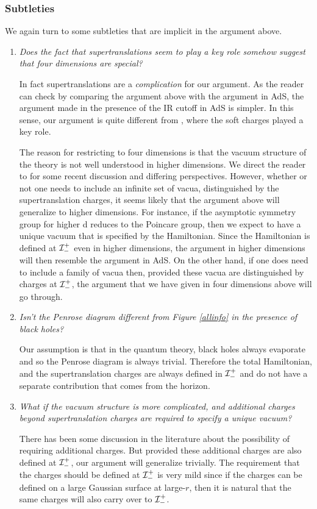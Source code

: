 \documentclass[12pt]{article}
\def \scrippast{{\cal I}^{+}_{-}}
\begin{document}
\subsubsection{Subtleties}
We again turn to some subtleties that are implicit in the argument above.
\begin{enumerate}[qseries]
\item {\em Does the fact that supertranslations seem to play a key role somehow suggest that four dimensions are special?}

In fact supertranslations are a {\em complication} for our argument. As the reader can check by comparing the argument above with the argument in AdS, the argument made in the presence of the IR cutoff in AdS is simpler. In this sense, our argument is quite different from \cite{Hawking:2016sgy,Hawking:2016msc}, where the soft charges played a key role.

The reason for restricting to four dimensions is that  the vacuum structure of the theory is not well understood in higher dimensions. We direct the reader to \cite{Kapec:2015vwa,Hollands:2016oma,Aggarwal:2018ilg,Campiglia:2017xkp,He:2019pll} for some recent discussion and differing perspectives. However, whether or not one needs to include an infinite set of vacua, distinguished by
the supertranslation charges, it seems likely that the argument above will generalize to higher dimensions. For instance, if the asymptotic symmetry group for higher d reduces to the Poincare group, then we expect to have a unique vacuum that is specified by the Hamiltonian. 
Since the Hamiltonian is defined at $\scrippast$ even in higher dimensions, the argument in higher dimensions will then resemble the argument in AdS. On the other hand, if one does need to include a family of vacua then, provided these vacua are distinguished by charges at $\scrippast$, the argument that we have given in four dimensions  above will go through.



\item{\em Isn't the Penrose diagram different from Figure \ref{allinfo}  in the presence of black holes?}

  Our assumption is that in the quantum theory, black holes always evaporate and so the Penrose diagram is always trivial. Therefore the total Hamiltonian, and the supertranslation charges are always defined in $\scrippast$ and do not have a separate contribution that comes from the horizon. 

\item {\em What if the vacuum structure is more complicated, and additional charges beyond  supertranslation charges are required to specify a unique vacuum?}

There has been some discussion in the literature \cite{Campiglia:2016jdj,Sahoo:2018lxl} about the possibility of requiring 
additional charges. But provided these additional charges are also defined at $\scrippast$, our argument will generalize trivially. The requirement that the charges should be defined at $\scrippast$ is very mild since if the charges 
can be defined on a large Gaussian surface at large-$r$, then it is natural that the same charges will also carry over to $\scrippast$. 
\end{enumerate}
\end{document}

